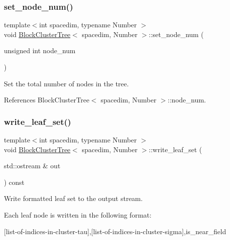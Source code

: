 \mbox{\label{classBlockClusterTree_a02be4a882acca918386ad024769925bc}} 
\subsubsection{\texorpdfstring{set\+\_\+node\+\_\+num()}{set\_node\_num()}}
{\footnotesize\ttfamily template$<$int spacedim, typename Number $>$ \\
void \hyperlink{classBlockClusterTree}{Block\+Cluster\+Tree}$<$ spacedim, Number $>$\+::set\+\_\+node\+\_\+num (\begin{DoxyParamCaption}\item[{unsigned int}]{node\+\_\+num }\end{DoxyParamCaption})}

Set the total number of nodes in the tree. 

References Block\+Cluster\+Tree$<$ spacedim, Number $>$\+::node\+\_\+num.

\mbox{\label{classBlockClusterTree_aef01b51b0530536bc5481492d4719375}} 
\subsubsection{\texorpdfstring{write\+\_\+leaf\+\_\+set()}{write\_leaf\_set()}\hspace{0.1cm}{\footnotesize\ttfamily [1/2]}}
{\footnotesize\ttfamily template$<$int spacedim, typename Number $>$ \\
void \hyperlink{classBlockClusterTree}{Block\+Cluster\+Tree}$<$ spacedim, Number $>$\+::write\+\_\+leaf\+\_\+set (\begin{DoxyParamCaption}\item[{std\+::ostream \&}]{out }\end{DoxyParamCaption}) const}

Write formatted leaf set to the output stream.

Each leaf node is written in the following format\+:

\begin{quote}


\end{quote}
\mbox{[}list-\/of-\/indices-\/in-\/cluster-\/tau\mbox{]},\mbox{[}list-\/of-\/indices-\/in-\/cluster-\/sigma\mbox{]},is\+\_\+near\+\_\+field

